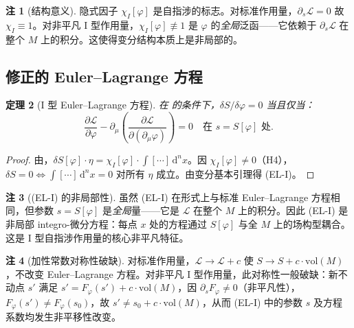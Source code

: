 \documentclass[12pt,a4paper]{article}
\newtheorem{theorem}{定理}[section]
\theoremstyle{definition}
\newtheorem{remark}[theorem]{注}
\newcommand{\mL}{\mathcal{L}}
\newcommand{\vol}{\mathrm{vol}}
\newcommand{\diff}{\mathrm{d}}
\newcommand{\dVol}{\,\diff^n x}
\begin{document}
\begin{remark}[结构意义]
隐式因子 $\chi_I[\varphi]$ 是自指涉的标志。对标准作用量，$\partial_s \mL = 0$ 故 $\chi_I \equiv 1$。对非平凡 I 型作用量，$\chi_I[\varphi] \not\equiv 1$ 是 $\varphi$ 的\emph{全局}泛函——它依赖于 $\partial_s \mL$ 在整个 $M$ 上的积分。这使得变分结构本质上是非局部的。
\end{remark}

\subsection{修正的 Euler--Lagrange 方程}

\begin{theorem}[I 型 Euler--Lagrange 方程]
\label{thm:el-I}
在 的条件下，$\delta S / \delta \varphi = 0$ 当且仅当：
\begin{equation}
\frac{\partial \mL}{\partial \varphi} - \partial_\mu\!\left(\frac{\partial \mL}{\partial(\partial_\mu \varphi)}\right) = 0 \quad \text{在 } s = S[\varphi] \text{ 处}.
\tag{EL-I}
\end{equation}
\end{theorem}

\begin{proof}
由，$\delta S[\varphi] \cdot \eta = \chi_I[\varphi] \cdot \int [\cdots] \dVol$。因 $\chi_I[\varphi] \neq 0$（H4），$\delta S = 0 \iff \int [\cdots] \dVol = 0$ 对所有 $\eta$ 成立。由变分基本引理得 (EL-I)。
\end{proof}

\begin{remark}[(EL-I) 的非局部性]
虽然 (EL-I) 在形式上与标准 Euler--Lagrange 方程相同，但参数 $s = S[\varphi]$ 是\emph{全局}量——它是 $\mL$ 在整个 $M$ 上的积分。因此 (EL-I) 是非局部 integro-微分方程：每点 $x$ 处的方程通过 $S[\varphi]$ 与全 $M$ 上的场构型耦合。这是 I 型自指涉作用量的核心非平凡特征。
\end{remark}

\begin{remark}[加性常数对称性破缺]
\label{rem:additive}
对标准作用量，$\mL \to \mL + c$ 使 $S \to S + c \cdot \vol(M)$，不改变 Euler--Lagrange 方程。对非平凡 I 型作用量，此对称性一般破缺：新不动点 $s'$ 满足 $s' = F_\varphi(s') + c \cdot \vol(M)$，因 $\partial_s F_\varphi \neq 0$（非平凡性），$F_\varphi(s') \neq F_\varphi(s_0)$，故 $s' \neq s_0 + c \cdot \vol(M)$，从而 (EL-I) 中的参数 $s$ 及方程系数均发生非平移性改变。
\end{remark}

\end{document}
